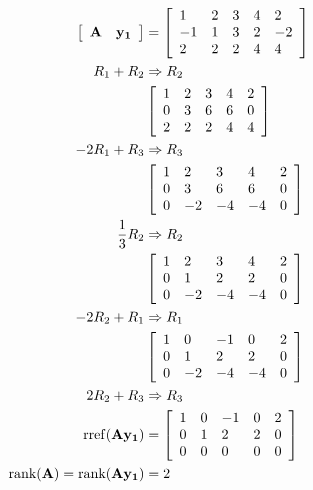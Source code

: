 \documentclass[main.tex]{subfiles}
\begin{document}
\begin{enumerate}
\begin{enumerate}
    \begin{equation}
    \begin{aligned}
        \left[\begin{array}{ll} \textbf{A} & \textbf{y\textsubscript{1}}\end{array}\right] & =
        \left[\begin{array}{lllll}
        1 & 2 & 3 & 4 & 2 \\
        -1 & 1 & 3 & 2 & -2 \\
        2 & 2 & 2 & 4 & 4
        \end{array}\right]\\
        R_1 + R_2 & \Rightarrow R_2\\
        & \left[\begin{array}{lllll}
        1 & 2 & 3 & 4 & 2 \\
        0 & 3 & 6 & 6 & 0 \\
        2 & 2 & 2 & 4 & 4
        \end{array}\right]\\
        -2R_1 + R_3 & \Rightarrow R_3\\
        & \left[\begin{array}{lllll}
        1 & 2 & 3 & 4 & 2 \\
        0 & 3 & 6 & 6 & 0 \\
        0 & -2 & -4 & -4 & 0
        \end{array}\right]\\
        \frac{1}{3}R_2 & \Rightarrow R_2\\
        & \left[\begin{array}{lllll}
        1 & 2 & 3 & 4 & 2 \\
        0 & 1 & 2 & 2 & 0 \\
        0 & -2 & -4 & -4 & 0
        \end{array}\right]\\
        -2R_2 + R_1 & \Rightarrow R_1\\
        & \left[\begin{array}{lllll}
        1 & 0 & -1 & 0 & 2 \\
        0 & 1 & 2 & 2 & 0 \\
        0 & -2 & -4 & -4 & 0
        \end{array}\right]\\
        2R_2 + R_3 & \Rightarrow R_3\\
        \operatorname{rref}(\textbf{A} \textbf{y\textsubscript{1}}) 
        & = \left[\begin{array}{lllll}
        1 & 0 & -1 & 0 & 2 \\
        0 & 1 & 2 & 2 & 0 \\
        0 & 0 & 0 & 0 & 0
        \end{array}\right]\\
        \text{rank}(\textbf{A}) = \text{rank}(\textbf{A} \textbf{y\textsubscript{1}}) & = 2
    \end{aligned}
    \end{equation}


\end{enumerate}
\end{enumerate}
\end{document}
